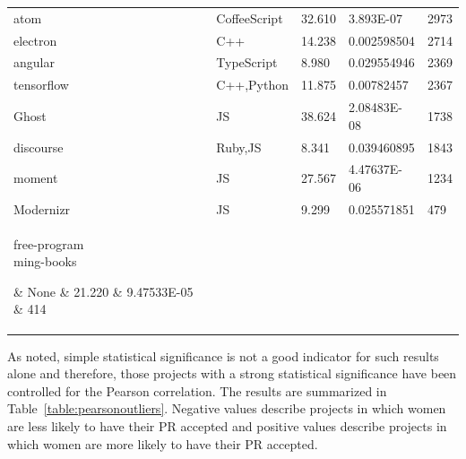 \begin{table}[!t]
\begin{tabular} {  l | l | l | l | l}
                 atom                    &       CoffeeScript                   &       32.610                  &       3.893E-07               &       2973            \\
                 electron                &       C++                            &       14.238                  &       0.002598504             &       2714            \\
                 angular                 &       TypeScript                     &       8.980                   &       0.029554946             &       2369            \\
                 tensorflow              &       C++,Python                     &       11.875                  &       0.00782457              &       2367            \\
                 Ghost                   &       \ac{JS}                      	&       38.624                  &       2.08483E-08             &       1738            \\
                 discourse               &       Ruby,\ac{JS}	         	&       8.341                   &       0.039460895             &       1843            \\
                 moment                  &       \ac{JS}                      	&       27.567                  &       4.47637E-06             &       1234            \\
                 Modernizr               &       \ac{JS}                      	&       9.299                   &       0.025571851             &       479             \\
		 \parbox[t]{1.7cm}{free-program\\ming-books}  &       None                           &       21.220                  &       9.47533E-05             &       414             \\ \hline

                                                                                                 \\
                                                                                 \\ \hline
	\end{tabular}
\end{table}

As \citeauthor{genderdiff:2016} noted, simple statistical significance is not a good indicator for such results alone and therefore, those projects with a strong statistical significance have been controlled for the Pearson correlation. The results are summarized in Table~\ref{table:pearsonoutliers}. Negative values describe projects in which women are less likely to have their PR accepted and positive values describe projects in which women are more likely to have their PR accepted.


